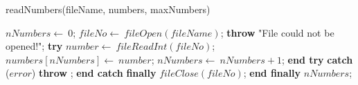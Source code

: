 \documentclass[a4paper,10pt]{article}
\begin{document}
\begin{algorithm}
\caption{readNumbers(fileName, numbers, maxNumbers)}
\begin{algorithmic}[5]

\STATE {}
\STATE {}
\STATE {}
  \STATE \(nNumbers\gets\ 0\);
  \STATE \(fileNo\gets\ fileOpen(fileName)\);
    \STATE \textbf{throw} \(\)"{}File could not be opened!"{}\(\);
  \ENDIF
  \STATE \textbf{try}  \BODY
      \STATE \(number\gets\ fileReadInt(fileNo)\);
      \STATE \(numbers[nNumbers]\gets\ number\);
      \STATE \(nNumbers\gets\ nNumbers+1\);
    \ENDWHILE
  \ENDBODY \STATE \textbf{end try}
  \STATE \textbf{catch} (\(error\)) \BODY
    \STATE \textbf{throw} \(\);
  \ENDBODY \STATE \textbf{end catch}
  \STATE \textbf{finally} \BODY
    \STATE \(fileClose(fileNo)\);
  \ENDBODY \STATE \textbf{end finally}
  \RETURN\(nNumbers\);

\end{algorithmic}
\end{algorithm}
\end{document}
